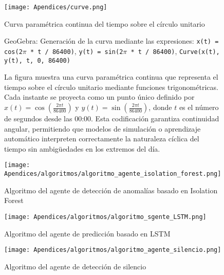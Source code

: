 \begin{figure}[ht!]
  \centering
  \texttt{[image: Apendices/curve.png]}
  \caption{Curva paramétrica continua del tiempo sobre el círculo unitario}
  \caption*{GeoGebra: Generación de la curva mediante las expresiones: \newline
  \texttt{x(t) = cos(2$\pi$ * t / 86400)}, \quad
  \texttt{y(t) = sin(2$\pi$ * t / 86400)}, \quad
  \texttt{Curve(x(t), y(t), t, 0, 86400)}}
  \caption*{La figura muestra una curva paramétrica continua que representa el tiempo sobre el círculo unitario mediante funciones trigonométricas. Cada instante se proyecta como un punto único definido por \( x(t) = \cos\left(\frac{2\pi t}{86400}\right) \) y \( y(t) = \sin\left(\frac{2\pi t}{86400}\right) \), donde \( t \) es el número de segundos desde las 00:00. Esta codificación garantiza continuidad angular, permitiendo que modelos de simulación o aprendizaje automático interpreten correctamente la naturaleza cíclica del tiempo sin ambigüedades en los extremos del día.}
  \label{fig:curva-tiempo-circular}
\end{figure}


\begin{figure}[ht!]
  \centering
  \texttt{[image: Apendices/algoritmos/algoritmo\_agente\_isolation\_forest.png]}
  \caption{Algoritmo del agente de detección de anomalías basado en Isolation Forest}
  \label{fig:algoritmo_agente_isolation_forest}
\end{figure}

\begin{figure}[ht!]
  \centering
  \texttt{[image: Apendices/algoritmos/algoritmo\_sgente\_LSTM.png]}
  \caption{Algoritmo del agente de predicción basado en LSTM}
  \label{fig:algoritmo_agente_LSTM}
\end{figure}

\begin{figure}[ht!]
  \centering
  \texttt{[image: Apendices/algoritmos/algoritmo\_agente\_silencio.png]}
  \caption{Algoritmo del agente de detección de silencio}
  \label{fig:algoritmo_agente_silencio}
\end{figure}


